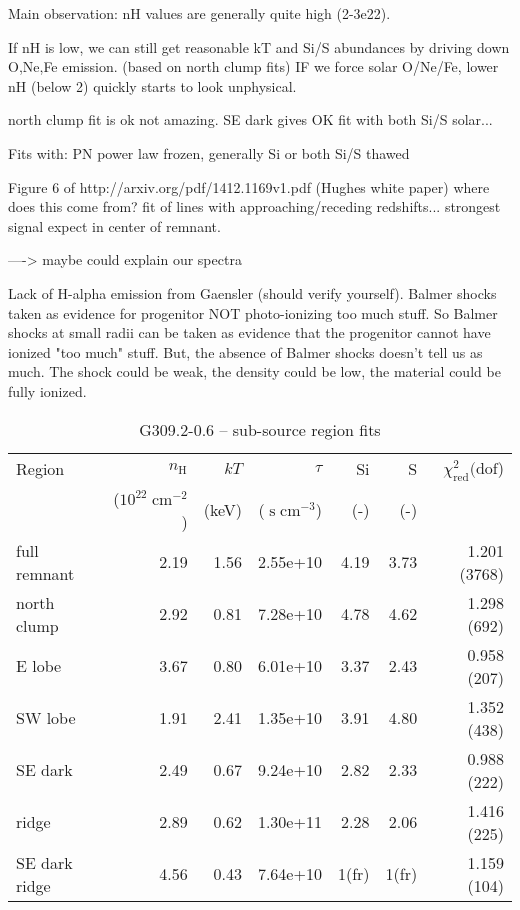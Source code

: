 \documentclass[preprint2,tighten,trackchanges]{aastex6}
\newcommand*{\mt}{\mathrm}
\newcommand*{\unit}[1]{\;\mt{#1}}  %
\begin{document}
Main observation: nH values are generally quite high (2-3e22).

If nH is low, we can still get reasonable kT and Si/S abundances
by driving down O,Ne,Fe emission. (based on north clump fits)
IF we force solar O/Ne/Fe, lower nH (below 2) quickly starts to look
unphysical.

north clump fit is ok not amazing.
SE dark gives OK fit with both Si/S solar...

Fits with: PN power law frozen, generally Si or both Si/S thawed


Figure 6 of http://arxiv.org/pdf/1412.1169v1.pdf (Hughes white paper)
where does this come from? fit of lines with approaching/receding redshifts...
strongest signal expect in center of remnant.

----> maybe could explain our spectra

Lack of H-alpha emission from Gaensler (should verify yourself).
Balmer shocks taken as evidence for progenitor NOT photo-ionizing too much
stuff.  So Balmer shocks at small radii can be taken as evidence that the
progenitor cannot have ionized "too much" stuff.
But, the absence of Balmer shocks doesn't tell us as much.
The shock could be weak, the density could be low, the material could be fully
ionized.



\begin{table*}
    \centering
    \caption{G309.2-0.6 -- sub-source region fits}
    \begin{tabular}{@{}lrrrrrr@{}}
        \toprule
        Region & $n_\mathrm{H}$             & $kT$  & $\tau$                & Si  & S   & $\chi^2_{\mathrm{red}} (\mathrm{dof}$) \\
               & ($10^{22} \unit{cm^{-2}}$) & (keV) & ($\unit{s\;cm^{-3}}$) & (-) & (-) &  \\
        \midrule
        full remnant  & 2.19 & 1.56 & 2.55e+10 &  4.19 & 3.73 & 1.201 (3768) \\
        \midrule
        north clump & 2.92 & 0.81 & 7.28e+10 & 4.78 & 4.62 & 1.298 (692) \\  %
        E lobe & 3.67 & 0.80 & 6.01e+10 & 3.37 & 2.43 & 0.958 (207) \\  %
        SW lobe & 1.91 & 2.41 & 1.35e+10 & 3.91 & 4.80 & 1.352 (438) \\  %
        SE dark & 2.49 & 0.67 & 9.24e+10 & 2.82 & 2.33 & 0.988 (222) \\  %
        \midrule
        ridge & 2.89 & 0.62 & 1.30e+11 & 2.28 & 2.06 & 1.416 (225) \\  %
        SE dark ridge & 4.56 & 0.43 & 7.64e+10 & 1(fr) & 1(fr) & 1.159 (104) \\  %
        \bottomrule
    \end{tabular}
\end{table*}
\end{document}
